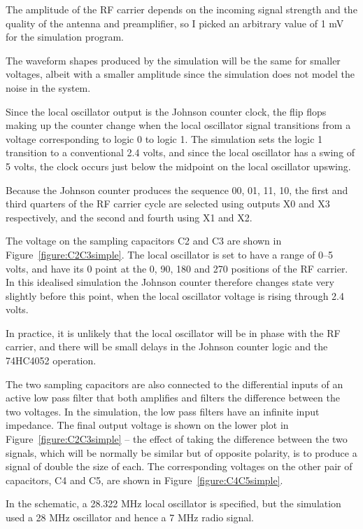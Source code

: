 \documentclass[11pt, twoside]{article}
\begin{document}
The amplitude of the RF carrier depends on the incoming signal
strength and the quality of the antenna and preamplifier, so I picked
an arbitrary value of 1 mV for the simulation program.

The waveform shapes produced by the simulation will be the same for
smaller voltages, albeit with a smaller amplitude since the simulation
does not model the noise in the system.

Since the local oscillator output is the Johnson counter clock, the
flip flops making up the counter change when the local oscillator
signal transitions from a voltage corresponding to logic 0 to logic 1.
The simulation sets the logic 1 transition to a conventional 2.4
volts, and since the local oscillator has a swing of 5 volts, the
clock occurs just below the midpoint on the local oscillator upswing.

Because the Johnson counter produces the sequence 00, 01, 11, 10, the
first and third quarters of the RF carrier cycle are selected using
outputs X0 and X3 respectively, and the second and fourth using X1 and
X2.

The voltage on the sampling capacitors C2 and C3 are shown in
Figure~\ref{figure:C2C3simple}. The local oscillator is set to have a
range of 0--5 volts, and have its 0{\degree} point at the 0{\degree},
90{\degree}, 180{\degree} and 270{\degree} positions of the RF
carrier.  In this idealised simulation the Johnson counter therefore
changes state very slightly before this point, when the local
oscillator voltage is rising through 2.4 volts.

In practice, it is unlikely that the local oscillator will be in phase
with the RF carrier, and there will be small delays in the Johnson
counter logic and the 74HC4052 operation.

The two sampling capacitors are also connected to the differential
inputs of an active low pass filter that both amplifies and filters
the difference between the two voltages.  In the simulation, the low
pass filters have an infinite input impedance. The final output
voltage is shown on the lower plot in Figure~\ref{figure:C2C3simple}
-- the effect of taking the difference between the two signals, which
will be normally be similar but of opposite polarity, is to produce a
signal of double the size of each.  The corresponding voltages on the
other pair of capacitors, C4 and C5, are shown in
Figure~\ref{figure:C4C5simple}.

In the \cite{LY1GP:2007} schematic, a 28.322 MHz local oscillator is
specified, but the simulation used a 28 MHz oscillator and hence a 7
MHz radio signal.
\end{document}
